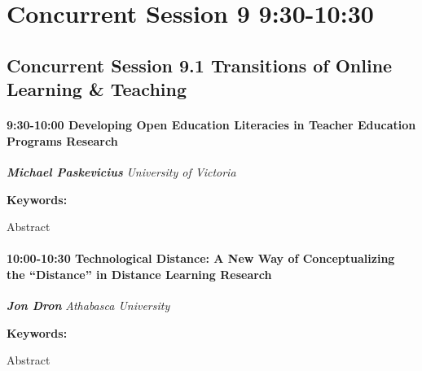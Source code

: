 \documentclass[
]{book}
\begin{document}
\hypertarget{concurrent-session-9-930-1030}{%
\section*{Concurrent Session 9 \textbar{} 9:30-10:30}\label{concurrent-session-9-930-1030}}

\hypertarget{concurrent-session-9.1-transitions-of-online-learning-teaching}{%
\subsection*{Concurrent Session 9.1 \textbar{} Transitions of Online Learning \& Teaching}\label{concurrent-session-9.1-transitions-of-online-learning-teaching}}

\begin{session}
\hypertarget{developing-open-education-literacies-in-teacher-education-programs-research}{%
\paragraph*{\texorpdfstring{9:30-10:00 \textbar{} \textbf{Developing
Open Education Literacies in Teacher Education Programs} \textbar{}
Research}{9:30-10:00 \textbar{} Developing Open Education Literacies in Teacher Education Programs \textbar{} Research}}\label{developing-open-education-literacies-in-teacher-education-programs-research}}

\textbf{\emph{Michael Paskevicius}} \textbar{} \emph{University of
Victoria}

\textbf{Keywords:}

Abstract
\end{session}

\begin{session}
\hypertarget{technological-distance-a-new-way-of-conceptualizing-the-distance-in-distance-learning-research}{%
\paragraph*{\texorpdfstring{10:00-10:30 \textbar{} \textbf{Technological
Distance: A New Way of Conceptualizing the ``Distance'' in Distance
Learning} \textbar{}
Research}{10:00-10:30 \textbar{} Technological Distance: A New Way of Conceptualizing the ``Distance'' in Distance Learning \textbar{} Research}}\label{technological-distance-a-new-way-of-conceptualizing-the-distance-in-distance-learning-research}}

\textbf{\emph{Jon Dron}} \textbar{} \emph{Athabasca University}

\textbf{Keywords:}

Abstract
\end{session}
\end{document}
